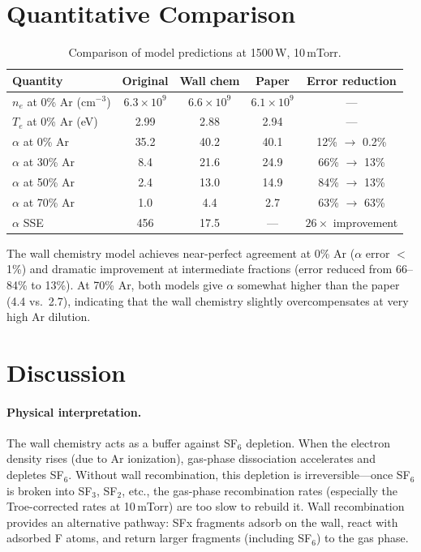 \documentclass[11pt,a4paper]{article}
\newcommand{\Te}{T_e}
\newcommand{\ne}{n_e}
\begin{document}
\section{Quantitative Comparison}

\begin{table}[H]
\centering
\caption{Comparison of model predictions at 1500\,W, 10\,mTorr.}
\label{tab:comparison}
\small
\begin{tabular}{lcccc}
\toprule
Quantity & Original & Wall chem & Paper & Error reduction \\
\midrule
$\ne$ at 0\% Ar (cm$^{-3}$) & $6.3 \times 10^9$ & $6.6 \times 10^9$ & $6.1 \times 10^9$ & --- \\
$\Te$ at 0\% Ar (eV) & 2.99 & 2.88 & 2.94 & --- \\
$\alpha$ at 0\% Ar & 35.2 & 40.2 & 40.1 & 12\% $\to$ 0.2\% \\
$\alpha$ at 30\% Ar & 8.4 & 21.6 & 24.9 & 66\% $\to$ 13\% \\
$\alpha$ at 50\% Ar & 2.4 & 13.0 & 14.9 & 84\% $\to$ 13\% \\
$\alpha$ at 70\% Ar & 1.0 & 4.4 & 2.7 & 63\% $\to$ 63\% \\
\midrule
$\alpha$ SSE & 456 & 17.5 & --- & $26\times$ improvement \\
\bottomrule
\end{tabular}
\end{table}

The wall chemistry model achieves near-perfect agreement at 0\% Ar ($\alpha$ error $<$1\%) and dramatic improvement at intermediate fractions (error reduced from 66--84\% to 13\%).  At 70\% Ar, both models give $\alpha$ somewhat higher than the paper (4.4 vs.\ 2.7), indicating that the wall chemistry slightly overcompensates at very high Ar dilution.

\section{Discussion}

\paragraph{Physical interpretation.}  The wall chemistry acts as a buffer against SF$_6$ depletion.  When the electron density rises (due to Ar ionization), gas-phase dissociation accelerates and depletes SF$_6$.  Without wall recombination, this depletion is irreversible---once SF$_6$ is broken into SF$_3$, SF$_2$, etc., the gas-phase recombination rates (especially the Troe-corrected rates at 10\,mTorr) are too slow to rebuild it.  Wall recombination provides an alternative pathway: SFx fragments adsorb on the wall, react with adsorbed F atoms, and return larger fragments (including SF$_6$) to the gas phase.
\end{document}

